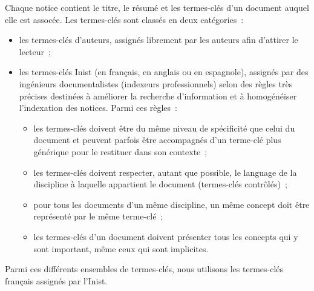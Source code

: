   Chaque notice contient le titre, le résumé et les termes-clés d'un document
  auquel elle est assocée. Les termes-clés sont classés en deux catégories~:
  \begin{itemize}
    \item{les termes-clés d'auteurs, assignés librement par les auteurs afin
          d'attirer le lecteur~;}
    \item{les termes-clés Inist (en français, en anglais ou en espagnole),
          assignés par des ingénieurs documentalistes (indexeurs professionnels)
          selon des règles très précises destinées à améliorer la recherche
          d'information et à homogénéiser l'indexation des notices. Parmi ces
          règles~:}
    \begin{itemize}
      \item{les termes-clés doivent être du même niveau de spécificité que celui
            du document et peuvent parfois être accompagnés d'un terme-clé plus
            générique pour le restituer dans son contexte~;}
      \item{les termes-clés doivent respecter, autant que possible, le language
            de la discipline à laquelle appartient le document (termes-clés
            contrôlés)~;}
      \item{pour tous les documents d'un même discipline, un même concept doit
            être représenté par le même terme-clé~;}
      \item{les termes-clés d'un document doivent présenter tous les concepts
            qui y sont important, même ceux qui sont implicites.}
    \end{itemize}
  \end{itemize}
  Parmi ces différents ensembles de termes-clés, nous utilisons les termes-clés
  français assignés par l'Inist.

